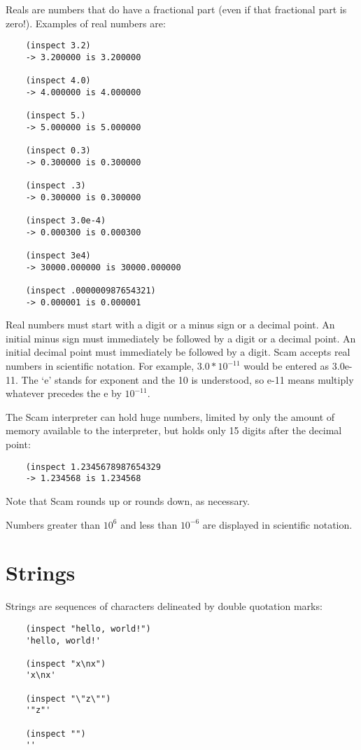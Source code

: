 Reals are numbers that do have a fractional part (even if that fractional
part is zero!). Examples of real numbers are:

\begin{verbatim}
    (inspect 3.2)
    -> 3.200000 is 3.200000
    
    (inspect 4.0)
    -> 4.000000 is 4.000000
       
    (inspect 5.)
    -> 5.000000 is 5.000000
       
    (inspect 0.3)
    -> 0.300000 is 0.300000
       
    (inspect .3)
    -> 0.300000 is 0.300000
    
    (inspect 3.0e-4)
    -> 0.000300 is 0.000300
    
    (inspect 3e4)
    -> 30000.000000 is 30000.000000
    
    (inspect .000000987654321)
    -> 0.000001 is 0.000001
\end{verbatim}

Real numbers must start with a digit or a minus sign or a decimal
point. An initial minus sign must immediately be followed by a digit or a
decimal point. An initial decimal point must immediately be followed by
a digit. Scam accepts real numbers in scientific notation. For example,
$3.0 * 10^{-11}$ would be entered as 3.0e-11. The `e' stands for exponent and
the 10 is understood, so e-11 means multiply whatever precedes the
e by $10^{-11}$.

The Scam interpreter can hold huge numbers,
limited by only the amount of memory available to the
interpreter,
but holds only 15 digits after the decimal point:

\begin{verbatim}
    (inspect 1.2345678987654329
    -> 1.234568 is 1.234568
\end{verbatim}

Note that Scam rounds up or rounds down, as necessary.

Numbers greater than $10^6$ and
less than $10^{-6}$ are displayed in
scientific notation.

\section{Strings}

Strings are sequences of characters delineated by double quotation marks:

\begin{verbatim}
    (inspect "hello, world!")
    'hello, world!'
    
    (inspect "x\nx")
    'x\nx'
    
    (inspect "\"z\"")
    '"z"' 
    
    (inspect "")
    ''
\end{verbatim}

